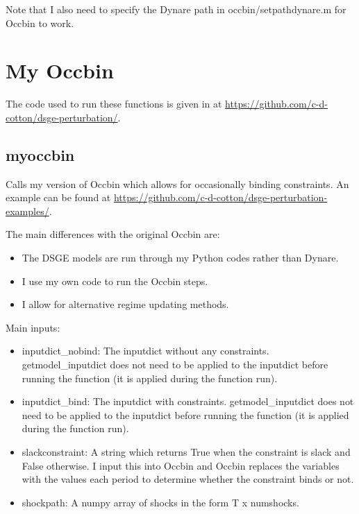 \documentclass{article}
\theoremstyle{definition}
\begin{document}
Note that I also need to specify the Dynare path in occbin/setpathdynare.m for Occbin to work.


\section{My Occbin}
The code used to run these functions is given in  at \url{https://github.com/c-d-cotton/dsge-perturbation/}.

\subsection{myoccbin}
Calls my version of Occbin which allows for occasionally binding constraints. An example can be found  at \url{https://github.com/c-d-cotton/dsge-perturbation-examples/}.

The main differences with the original Occbin are:
\begin{itemize}
    \item The DSGE models are run through my Python codes rather than Dynare.
    \item I use my own code to run the Occbin steps.
    \item I allow for alternative regime updating methods.
\end{itemize}

Main inputs:
\begin{itemize}
    \item inputdict\_nobind: The inputdict without any constraints. getmodel\_inputdict does not need to be applied to the inputdict before running the function (it is applied during the function run).
    \item inputdict\_bind: The inputdict with constraints. getmodel\_inputdict does not need to be applied to the inputdict before running the function (it is applied during the function run).
    \item slackconstraint: A string which returns True when the constraint is slack and False otherwise. I input this into Occbin and Occbin replaces the variables with the values each period to determine whether the constraint binds or not.
    \item shockpath: A numpy array of shocks in the form T x numshocks.
\end{itemize}
\end{document}
